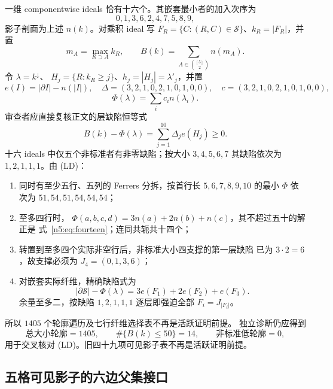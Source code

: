 一维 componentwise ideals 恰有十六个。其嵌套最小者的加入次序为
\[
0,1,3,6,2,4,7,5,8,9,
\]
影子剖面为上述 \(n(k)\)。对乘积 ideal 写
\(F_R=\{C:(R,C)\in\mathcal S\}\)、\(k_R=|F_R|\)，并置
\[
m_A=\max_{R\supset A}k_R,\qquad
B(k)=\sum_{A\in\binom{[5]}2}n(m_A).
\]
令 \(\lambda=k^\downarrow\)、
\(H_j=\{R:k_R\ge j\}\)、\(h_j=|H_j|=\lambda'_j\)，并置
\[
e(I)=|\partial I|-n(|I|),\quad
\Delta=(3,2,1,0,2,1,0,1,0,0),\quad
c=(3,2,1,0,2,1,0,1,0,0),
\]
\[
\Phi(\lambda)=\sum_i c_i n(\lambda_i).
\]
审查者应直接复核正文的层缺陷恒等式
\[
B(k)-\Phi(\lambda)=\sum_{j=1}^{10}\Delta_j e(H_j)\ge0.       \tag{LD}
\]
十六 ideals 中仅五个非标准者有非零缺陷；按大小 \(3,4,5,6,7\)
其缺陷依次为 \(1,2,1,1,1\)。由 (LD)：
\begin{enumerate}
\item 同时有至少五行、五列的 Ferrers 分拆，按首行长
  \(5,6,7,8,9,10\) 的最小 \(\Phi\) 依次为
  \(51,54,51,54,54,54\)；
\item 至多四行时，
  \(\Phi(a,b,c,d)=3n(a)+2n(b)+n(c)\)，其不超过五十的解正是
  式~\eqref{n5:eq:fourteen}；连同共轭共十四个；
\item 转置到至多四个实际非空行后，非标准大小四支撑的第一层缺陷
  已为 \(3\cdot2=6\)，故支撑必须为 \(J_4=(0,1,3,6)\)；
\item 对嵌套实际纤维，精确缺陷式为
  \[
  |\partial\mathcal S|-\Phi(\lambda)
  =3e(F_1)+2e(F_2)+e(F_3).
  \]
  余量至多二，按缺陷 \(1,2,1,1,1\) 逐层即强迫全部
  \(F_i=J_{|F_i|}\)。
\end{enumerate}
所以 \(1405\) 个轮廓遍历及七行纤维选择表不再是活跃证明前提。
独立诊断仍应得到
\[
\text{总大小轮廓}=1405,\qquad
\#\{B(k)\le50\}=14,\qquad
\text{非标准低轮廓}=0,
\]
用于交叉核对 (LD)。旧四十九项可见影子表不再是活跃证明前提。

\subsection{五格可见影子的六边父集接口}

